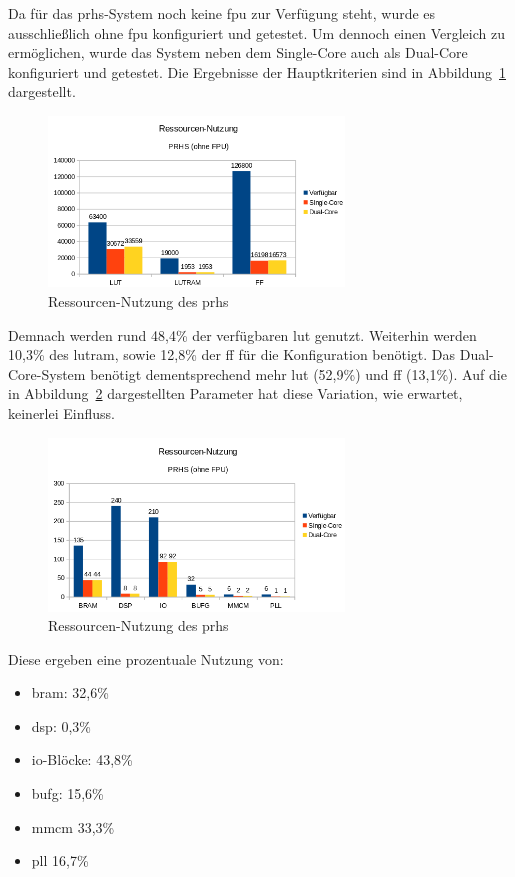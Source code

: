 Da für das \ac{prhs}-System noch keine \ac{fpu} zur Verfügung steht, wurde es ausschließlich ohne \ac{fpu} konfiguriert und getestet.
Um dennoch einen Vergleich zu ermöglichen, wurde das System neben dem Single-Core auch als Dual-Core konfiguriert und getestet.
Die Ergebnisse der Hauptkriterien sind in Abbildung~\ref{fig:ressourcenprhs1} dargestellt.\\

\begin{figure}[H]
\centering
\includegraphics[width=0.7\textwidth]{Hauptteil/ressourcenprhs1.png}
\caption{Ressourcen-Nutzung des \ac{prhs}}
\label{fig:ressourcenprhs1}
\end{figure}

Demnach werden rund 48,4\% der verfügbaren \ac{lut} genutzt. Weiterhin werden 10,3\% des \ac{lutram}, sowie 12,8\% der \ac{ff} für die Konfiguration benötigt. Das Dual-Core-System benötigt
dementsprechend mehr \ac{lut} (52,9\%) und \ac{ff} (13,1\%). Auf die in Abbildung~\ref{fig:ressourcenprhs2} dargestellten Parameter hat diese Variation, wie erwartet, keinerlei Einfluss.\\

\begin{figure}[H]
\centering
\includegraphics[width=0.7\textwidth]{Hauptteil/ressourcenprhs2.png}
\caption{Ressourcen-Nutzung des \ac{prhs}}
\label{fig:ressourcenprhs2}
\end{figure}

Diese ergeben eine prozentuale Nutzung von:\\
\begin{itemize}
  \item \ac{bram}: 32,6\%
  \item \ac{dsp}:  0,3\%
  \item \ac{io}-Blöcke: 43,8\%
  \item \ac{bufg}: 15,6\%
  \item \ac{mmcm} 33,3\%
  \item \ac{pll} 16,7\%
\end{itemize}


